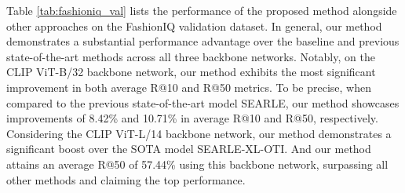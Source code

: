 \documentclass[10pt,twocolumn,letterpaper]{article}
\begin{document}
Table \ref{tab:fashioniq_val} lists the performance of the proposed method alongside other approaches on the FashionIQ validation dataset. In general, our method demonstrates a substantial performance advantage over the baseline and previous state-of-the-art methods across all three backbone networks. Notably, on the CLIP ViT-B/32 backbone network, our method exhibits the most significant improvement in both average R@10 and R@50 metrics. To be precise, when compared to the previous state-of-the-art model SEARLE, our method showcases improvements of 8.42\% and 10.71\% in average R@10 and R@50, respectively. Considering the CLIP ViT-L/14 backbone network, our method demonstrates a significant boost over the SOTA model SEARLE-XL-OTI. And our method attains an average R@50 of 57.44\% using this backbone network, surpassing all other methods and claiming the top performance. 
\end{document}
